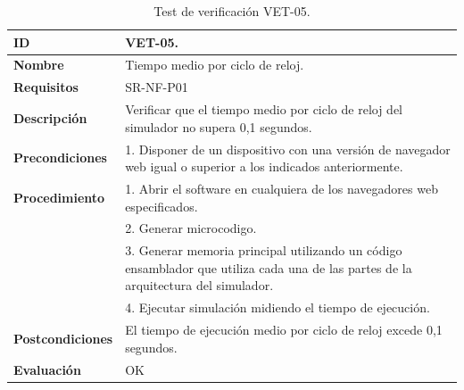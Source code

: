 \begin{center}
\begin{table}[htb]
\centering
\caption{Test de verificación VET-05.}
\begin{tabular}{@{}p{2.5cm} p{13cm}@{}} 
\toprule
\textbf{ID} 					& VET-05. \\
\midrule
\textbf{Nombre} 				& Tiempo medio por ciclo de reloj. \\
\midrule
\textbf{Requisitos} 		& SR-NF-P01\\
\midrule
\textbf{Descripción} 		& Verificar que el tiempo medio por ciclo de reloj del simulador no supera 0,1 segundos. \\
\midrule
\textbf{Precondiciones}		& 1. Disponer de un dispositivo con una versión de navegador web igual o superior a los indicados anteriormente. \\
\midrule
\textbf{Procedimiento}			& 1. Abrir el \gls{software} en cualquiera de los navegadores web especificados. \\
							& 2. Generar \gls{microcodigo}.\\
							& 3. Generar memoria principal utilizando un código \gls{ensamblador} que utiliza cada una de las partes de la arquitectura del simulador.\\
							& 4. Ejecutar simulación midiendo el tiempo de ejecución.\\
\midrule
\textbf{Postcondiciones} 		&  El tiempo de ejecución medio por ciclo de reloj excede 0,1 segundos.\\
\midrule
\textbf{Evaluación} 			& OK \\
\bottomrule
\end{tabular}
\label{tab:vet05}
\end{table}
\end{center}

